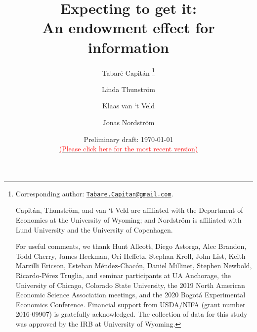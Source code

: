 
\title{\vspace{-2cm}
      Expecting to get it: \\ An endowment effect for information
      }

\author{\small{Tabaré Capitán}
          \thanks{Corresponding author: \href{mailto:Tabare.Capitan@gmail.com}{\texttt{Tabare.Capitan@gmail.com}}.


          Capitán, Thunström, and van ‘t Veld are affiliated with the Department of Economics at the University of Wyoming; and Nordström is affiliated with Lund University and the University of Copenhagen.


          For useful comments, we thank Hunt Allcott, Diego Astorga, Alec Brandon, Todd Cherry, James Heckman, Ori Heffetz, Stephan Kroll, John List, Keith Marzilli Ericson, Esteban Méndez-Chacón, Daniel Millinet, Stephen Newbold, Ricardo-Pérez Truglia, and seminar participants at UA Anchorage, the University of Chicago, Colorado State University, the 2019 North American Economic Science Association meetings, and the 2020 Bogotá Experimental Economics Conference. Financial support from USDA/NIFA (grant number 2016-09907) is gratefully acknowledged. The collection of data for this study was approved by the IRB at University of Wyoming.}
        \and
        \small{Linda Thunström}
        \and
        \small{Klaas van ‘t Veld}
        \and
        \small{Jonas Nordström}
        }

\date{\vspace{0.5cm} {\small{Preliminary draft: \today}} \\ \href{https://www.tabarecapitan.com/jmp/}{\small{\textcolor{red}{(Please click here for the most recent version)}}}}

\maketitle

\thispagestyle{empty}   %

